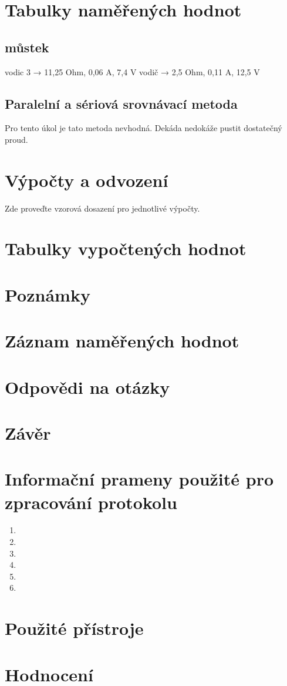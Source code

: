 \documentclass[a4]{article}
\begin{document}
\section{Tabulky naměřených hodnot}
\subsection{můstek}
vodic 3 → 11,25 Ohm, 0,06 A, 7,4 V
vodič → 2,5 Ohm, 0,11 A, 12,5 V

\subsection{Paralelní a sériová srovnávací metoda}
Pro tento úkol je tato metoda nevhodná. Dekáda nedokáže pustit dostatečný proud.
\section{Výpočty a odvození}
Zde proveďte vzorová dosazení pro jednotlivé výpočty.

\section{Tabulky vypočtených hodnot}


\section{Poznámky}

\section{Záznam naměřených hodnot}



\section{Odpovědi na otázky}

\section{Závěr}

\section{Informační prameny použité pro zpracování protokolu}
\begin{enumerate}
    \item {\dotfill}
    \item {\dotfill}
    \item {\dotfill}
    \item {\dotfill}
    \item {\dotfill}
    \item {\dotfill}
\end{enumerate}


\section{Použité přístroje}

\section{Hodnocení}
\end{document}
